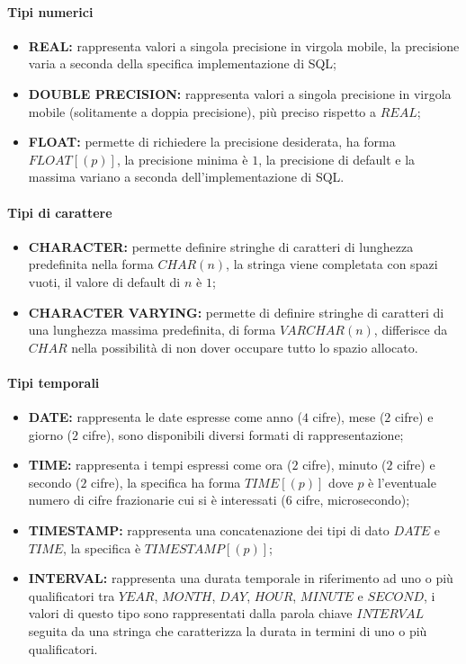 \paragraph{Tipi numerici}%
\label{par:Tipi numerici}
\begin{itemize}
  \item \textbf{REAL:} rappresenta valori a singola precisione in virgola
    mobile, la precisione varia a seconda della specifica implementazione di
    SQL;
  \item \textbf{DOUBLE PRECISION:} rappresenta valori a singola precisione in
    virgola mobile (solitamente a doppia precisione), più preciso rispetto a
    $REAL$;
  \item \textbf{FLOAT:} permette di richiedere la precisione desiderata, ha
    forma $FLOAT[(p)]$, la precisione minima è $1$, la precisione di default e
    la massima variano a seconda dell'implementazione di SQL.
\end{itemize}

\paragraph{Tipi di carattere}%
\label{par:Tipi di carattere}
\begin{itemize}
  \item \textbf{CHARACTER:} permette definire stringhe di caratteri di lunghezza
    predefinita nella forma $CHAR(n)$, la stringa viene completata con spazi
    vuoti, il valore di default di $n$ è $1$;
  \item \textbf{CHARACTER VARYING:} permette di definire stringhe di caratteri
    di una lunghezza massima predefinita, di forma $VARCHAR(n)$, differisce da
    $CHAR$ nella possibilità di non dover occupare tutto lo spazio allocato.
\end{itemize}

\paragraph{Tipi temporali}%
\label{par:Tipi temporali}
\begin{itemize}
  \item \textbf{DATE:} rappresenta le date espresse come anno ($4$ cifre), mese
    ($2$ cifre) e giorno ($2$ cifre), sono disponibili diversi formati di
    rappresentazione;
  \item \textbf{TIME:} rappresenta i tempi espressi come ora ($2$ cifre), minuto
    ($2$ cifre) e secondo ($2$ cifre), la specifica ha forma $TIME[(p)]$ dove
    $p$ è l'eventuale numero di cifre frazionarie cui si è interessati ($6$
    cifre, microsecondo);
  \item \textbf{TIMESTAMP:} rappresenta una concatenazione dei tipi di dato
    $DATE$ e $TIME$, la specifica è $TIMESTAMP[(p)]$;
  \item \textbf{INTERVAL:} rappresenta una durata temporale in riferimento ad
    uno o più qualificatori tra $YEAR$, $MONTH$, $DAY$, $HOUR$, $MINUTE$ e
    $SECOND$, i valori di questo tipo sono rappresentati dalla parola chiave
    $INTERVAL$ seguita da una stringa che caratterizza la durata in termini di
    uno o più qualificatori.
\end{itemize}

